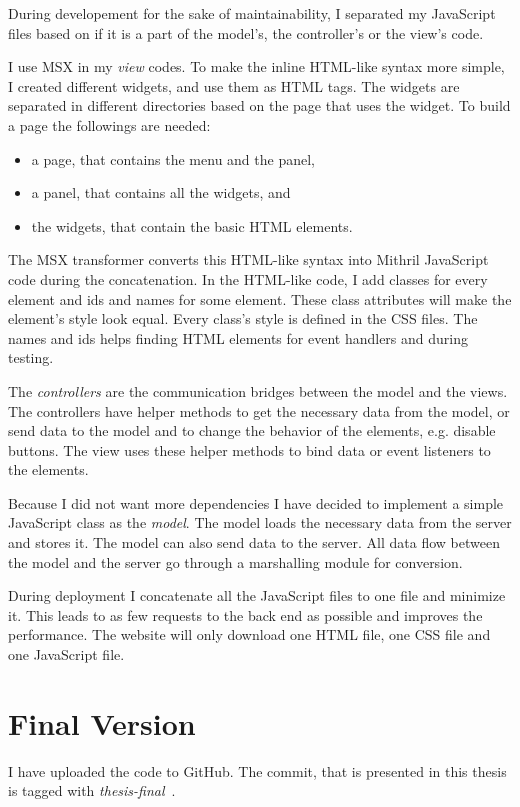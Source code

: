 During developement for the sake of maintainability, I separated my JavaScript files based on if it is a part of the model's, the controller's or the view's code. 

I use MSX in my \emph{view} codes. To make the inline HTML-like syntax more simple, I created different widgets, and use them as HTML tags. The widgets are separated in different directories based on the page that uses the widget. To build a page the followings are needed: 
\begin{itemize}
	\item a page, that contains the menu and the panel,
	\item a panel, that contains all the widgets, and
	\item the widgets, that contain the basic HTML elements.
\end{itemize}

The MSX transformer converts this HTML-like syntax into Mithril JavaScript code during the concatenation. In the HTML-like code, I add classes for every element and ids and names for some element. These class attributes will make the element's style look equal. Every class's style is defined in the CSS files. The names and ids helps finding HTML elements for event handlers and during testing.

The \emph{controllers} are the communication bridges between the model and the views. The controllers have helper methods to get the necessary data from the model, or send data to the model and to change the behavior of the elements, e.g. disable buttons. The view uses these helper methods to bind data or event listeners to the elements.

Because I did not want more dependencies I have decided to implement a simple JavaScript class as the \emph{model}. The model loads the necessary data from the server and stores it. The model can also send data to the server. All data flow between the model and the server go through a marshalling module for conversion.

During deployment I concatenate all the JavaScript files to one file and minimize it. This leads to as few requests to the back end as possible and improves the performance. The website will only download one HTML file, one CSS file and one JavaScript file.

\section{Final Version}
I have uploaded the code to GitHub. The commit, that is presented in this thesis is tagged with \emph{thesis-final}~\cite{Github-final}.

